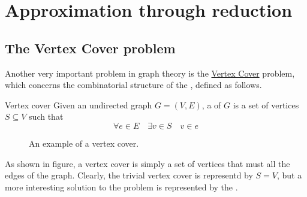 \documentclass[a4paper, 12pt]{report}
\begin{document}
    \section{Approximation through reduction}

    \subsection{The Vertex Cover problem}

    Another very important problem in graph theory is the \href{https://en.wikipedia.org/wiki/Vertex_cover}{Vertex Cover} problem, which concerns the combinatorial structure of the , defined as follows.

    \begin{frameddefn}{Vertex cover}
        Given an undirected graph $G = (V, E)$, a  of $G$ is a set of vertices $S \subseteq V$ such that $$\forall e \in E \quad \exists v \in S \quad v \in e$$
    \end{frameddefn}

    \begin{figure}[H]
        \centering
        \caption{An example of a vertex cover.}
    \end{figure}

    As shown in figure, a vertex cover is simply a set of vertices that must  all the edges of the graph. Clearly, the trivial vertex cover is representd by $S = V$, but a more interesting solution to the problem is represented by the .
\end{document}
